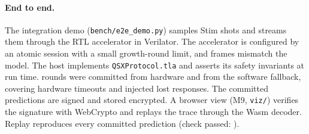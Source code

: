 \paragraph{End to end.} The integration demo (\texttt{bench/e2e\_demo.py}) samples  Stim shots and
streams them through the RTL accelerator in Verilator. The accelerator is configured by an atomic session with a
small growth-round limit, and  frames mismatch the model. The host implements
\texttt{QSXProtocol.tla} and asserts its safety invariants at run time.  rounds were committed from
hardware and  from the software fallback, covering  hardware timeouts and
 injected lost responses. The committed predictions are signed and stored encrypted. A browser view
(M9, \texttt{viz/}) verifies the signature with WebCrypto and replays the trace through the Wasm decoder. Replay
reproduces every committed prediction (check passed: ).
